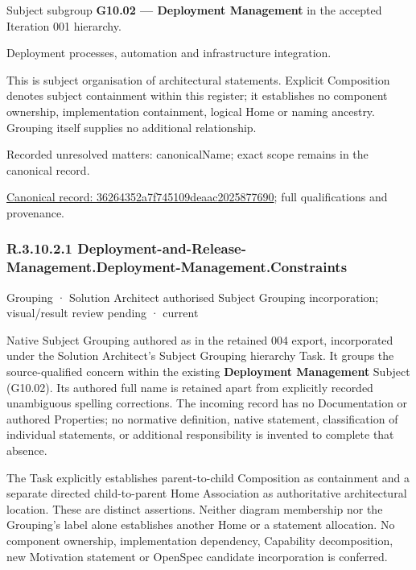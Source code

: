 Subject subgroup \textbf{G10.02 — Deployment Management} in the accepted Iteration 001 hierarchy.



Deployment processes, automation and infrastructure integration.



This is subject organisation of architectural statements. Explicit Composition denotes subject containment within this register; it establishes no component ownership, implementation containment, logical Home or naming ancestry. Grouping itself supplies no additional relationship.


{\small Recorded unresolved matters: canonicalName; exact scope remains in the canonical record.}\par
{\footnotesize \href{../../../../continuum/grouping/36264352a7f745109deaac2025877690.md}{Canonical record: 36264352a7f745109deaac2025877690}; full qualifications and provenance.}\par
\subsubsection*{R.3.10.2.1 Deployment-and-Release-Management.Deployment-Management.Constraints}
\label{navigation:R.3.10.2.1}

\label{element:af4f93db10cb47c282600babe51048e1}
{\small Grouping · Solution Architect authorised Subject Grouping incorporation; visual/result review pending · current}\par

Native Subject Grouping authored as \texttt{} in the retained 004 export,
incorporated under the Solution Architect's Subject Grouping hierarchy Task.
It groups the source-qualified \texttt{} concern within
the existing \textbf{Deployment Management} Subject (G10.02). Its authored full name
is retained apart from explicitly recorded unambiguous spelling corrections.
The incoming record has no Documentation or authored Properties; no normative
definition, native statement, classification of individual statements, or
additional responsibility is invented to complete that absence.



The Task explicitly establishes parent-to-child Composition as containment and
a separate directed child-to-parent Home Association as authoritative architectural
location. These are distinct assertions. Neither diagram membership nor the
Grouping's label alone establishes another Home or a statement allocation.
No component ownership, implementation dependency, Capability decomposition,
new Motivation statement or OpenSpec candidate incorporation is conferred.



